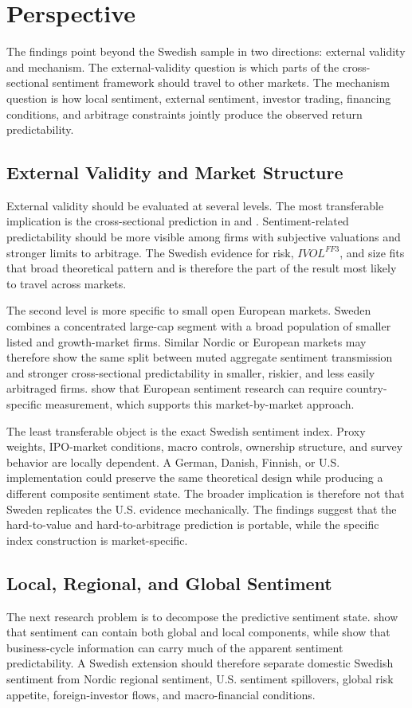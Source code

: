 \documentclass[11pt]{article}
\newcommand{\var}[1]{\ensuremath{#1}}
\begin{document}
\section{Perspective}
The findings point beyond the Swedish sample in two directions: external validity and mechanism. The external-validity question is which parts of the cross-sectional sentiment framework should travel to other markets. The mechanism question is how local sentiment, external sentiment, investor trading, financing conditions, and arbitrage constraints jointly produce the observed return predictability.

\subsection{External Validity and Market Structure}
External validity should be evaluated at several levels. The most transferable implication is the cross-sectional prediction in \citet{baker2006sentiment} and \citet{baker2007}. Sentiment-related predictability should be more visible among firms with subjective valuations and stronger limits to arbitrage. The Swedish evidence for risk, \var{IVOL^{FF3}}, and size fits that broad theoretical pattern and is therefore the part of the result most likely to travel across markets.

The second level is more specific to small open European markets. Sweden combines a concentrated large-cap segment with a broad population of smaller listed and growth-market firms. Similar Nordic or European markets may therefore show the same split between muted aggregate sentiment transmission and stronger cross-sectional predictability in smaller, riskier, and less easily arbitraged firms. \citet{finter2012german} show that European sentiment research can require country-specific measurement, which supports this market-by-market approach.

The least transferable object is the exact Swedish sentiment index. Proxy weights, IPO-market conditions, macro controls, ownership structure, and survey behavior are locally dependent. A German, Danish, Finnish, or U.S. implementation could preserve the same theoretical design while producing a different composite sentiment state. The broader implication is therefore not that Sweden replicates the U.S. evidence mechanically. The findings suggest that the hard-to-value and hard-to-arbitrage prediction is portable, while the specific index construction is market-specific.

\subsection{Local, Regional, and Global Sentiment}
The next research problem is to decompose the predictive sentiment state. \citet{baker2012global} show that sentiment can contain both global and local components, while \citet{sibley2012sentimental} show that business-cycle information can carry much of the apparent sentiment predictability. A Swedish extension should therefore separate domestic Swedish sentiment from Nordic regional sentiment, U.S. sentiment spillovers, global risk appetite, foreign-investor flows, and macro-financial conditions.
\end{document}

